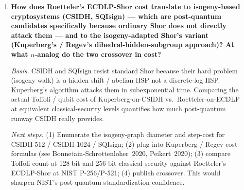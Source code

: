 \begin{enumerate}
\emph{Next steps.} (1) Locate published ternary reversible mod-inverse circuit
constructions and their Toffoli-equivalent (or $T$-count) analyses;
(2) if available, evaluate their cost at $n = 256/384/521$ and compare to
Roetteler's Toffoli / equivalent-$T$; (3) if not available, implement a base-3
extended-binary-GCD analog in Qualtran-qutrit or write it out symbolically.
Estimated effort: 1 person-month; a null result (ternary does not help ECDLP)
would itself be publishable.

\item \textbf{How does Roetteler's ECDLP-Shor cost translate to isogeny-based cryptosystems (CSIDH, SQIsign) --- which are post-quantum candidates specifically because ordinary Shor does not directly attack them --- and to the isogeny-adapted Shor's variant (Kuperberg's / Regev's dihedral-hidden-subgroup approach)? At what $n$-analog do the two crossover in cost?}

\emph{Basis.} CSIDH and SQIsign resist standard Shor because their hard problem
(isogeny walk) is a hidden shift / abelian HSP not a discrete-log HSP.
Kuperberg's algorithm attacks them in subexponential time. Comparing the
actual Toffoli / qubit cost of Kuperberg-on-CSIDH vs.\ Roetteler-on-ECDLP at
equivalent classical-security levels quantifies how much post-quantum runway
CSIDH really provides.

\emph{Next steps.} (1) Enumerate the isogeny-graph diameter and step-cost for
CSIDH-512 / CSIDH-1024 / SQIsign; (2) plug into Kuperberg / Regev cost formulas
(see Bonnetain-Schrottenloher~2020, Peikert~2020); (3) compare Toffoli count at
128-bit and 256-bit classical security against Roetteler's ECDLP-Shor at NIST
P-256/P-521; (4) publish crossover. This would sharpen NIST's post-quantum
standardization confidence.

\end{enumerate}
